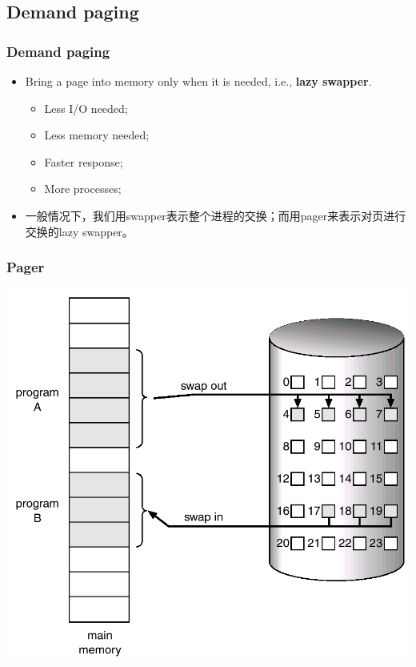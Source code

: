 \documentclass[CJKutf8,xcolor=pdftex,dvipsnames,table]{beamer}
\begin{document}
\begin{CJK*}{UTF8}{song}
  \section{Demand paging}
  
  \begin{frame}
    \frametitle{Demand paging} \pause
    \begin{itemize}
    \item{Bring a page into memory only when it is needed, i.e., \textbf{lazy swapper}.} \pause
      \begin{itemize}
      \item{Less I/O needed;} \pause
      \item{Less memory needed;} \pause
      \item{Faster response;} \pause
      \item{More processes;} \pause
      \end{itemize}
    \item{一般情况下，我们用swapper表示整个进程的交换；而用pager来表示对页进行交换的lazy swapper。}
    \end{itemize}
  \end{frame}
  
  \begin{frame}
    \frametitle{Pager} \pause
    \begin{center}
      \includegraphics[scale=.3]{v6f10-2}
    \end{center}
  \end{frame}
  

\end{CJK*}
\end{document}
